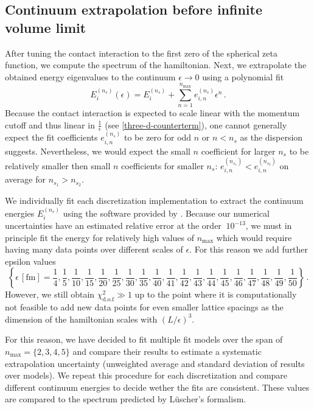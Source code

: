 \subsection{Continuum extrapolation before infinite volume limit}

After tuning the contact interaction to the first zero of the spherical zeta function, we compute the spectrum of the hamiltonian.
Next, we extrapolate the obtained energy eigenvalues to the continuum $\epsilon \to 0$ using a polynomial fit
\begin{equation}
    E^{(n_s)}_i(\epsilon) = E_i^{(n_s)} + \sum\limits_{n=1}^{n_\mathrm{max}} e_{i,n}^{(n_s)} \epsilon^n \, .
\end{equation}
Because the contact interaction is expected to scale linear with the momentum cutoff and thus linear in $\frac{1}{\epsilon}$ (see \eqref{three-d-counterterm}), one cannot generally expect the fit coefficients $e_{i,n}^{(n_s)}$ to be zero for odd $n$ or $n < n_s$ as the dispersion suggests.
Nevertheless, we would expect the small $n$ coefficient for larger $n_s$ to be relatively smaller then small $n$ coefficients for smaller $n_s$: $e_{i,n}^{(n_{s_1})} < e_{i,n}^{(n_{s_2})}$ on average for $n_{s_1} > n_{s_2}$.

We individually fit each discretization implementation to extract the continuum energies $E_i^{(n_s)}$ using the software provided by .
Because our numerical uncertainties have an estimated relative error at the order $~10^{-13}$, we must in principle fit the energy for relatively high values of $n_\mathrm{max}$ which would require having many data points over different scales of $\epsilon$.
For this reason we add further epsilon values
\begin{equation}
	\left\{
		\epsilon \, [\mathrm{fm}] =
		\frac{1}{4}, \frac{1}{5}, \frac{1}{10},
		\frac{1}{15}, \frac{1}{20}, \frac{1}{25},
		\frac{1}{ 30}, \frac{1}{ 35}, \frac{1}{ 40},
		\frac{1}{ 41}, \frac{1}{ 42}, \frac{1}{ 43},
		\frac{1}{ 44}, \frac{1}{45}, \frac{1}{ 46},
		\frac{1}{ 47}, \frac{1}{ 48}, \frac{1}{ 49}, \frac{1}{ 50}
	\right\}
	\, .
\end{equation}
However, we still obtain $\chi^2_{\mathrm{d.o.f}} \gg 1$ up to the point where it is computationally not feasible to add new data points for even smaller lattice spacings as the dimension of the hamiltonian scales with $(L/\epsilon)^3$.

For this reason, we have decided to fit multiple fit models over the span of $n_\mathrm{max} = \{2, 3, 4, 5\}$ and compare their results to estimate a systematic extrapolation uncertainty (unweighted average and standard deviation of results over models).
We repeat this procedure for each discretization and compare different continuum energies to decide wether the fits are consistent.
These values are compared to the spectrum predicted by L\"uscher's formalism.

